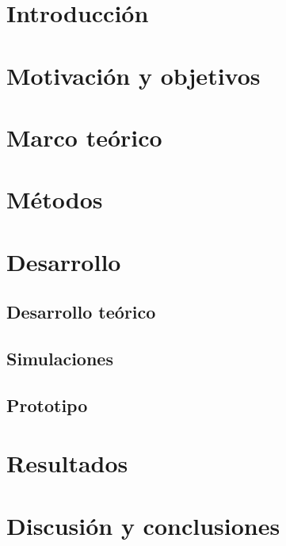 \documentclass[a4paper,12pt]{article}
\begin{document}
\newpage
\thispagestyle{plain}
\section{Introducción}

\newpage
\thispagestyle{plain}
\section{Motivación y objetivos}

\newpage
\thispagestyle{plain}
\section{Marco teórico}

\newpage
\thispagestyle{plain}
\section{Métodos}

\newpage
\thispagestyle{plain}
\section{Desarrollo}

\newpage
\thispagestyle{plain}
\subsection{Desarrollo teórico}

\newpage
\thispagestyle{plain}
\subsection{Simulaciones}

\newpage
\thispagestyle{plain}
\subsection{Prototipo}

\newpage
\thispagestyle{plain}
\section{Resultados}

\newpage
\thispagestyle{plain}
\section{Discusión y conclusiones}
\end{document}
